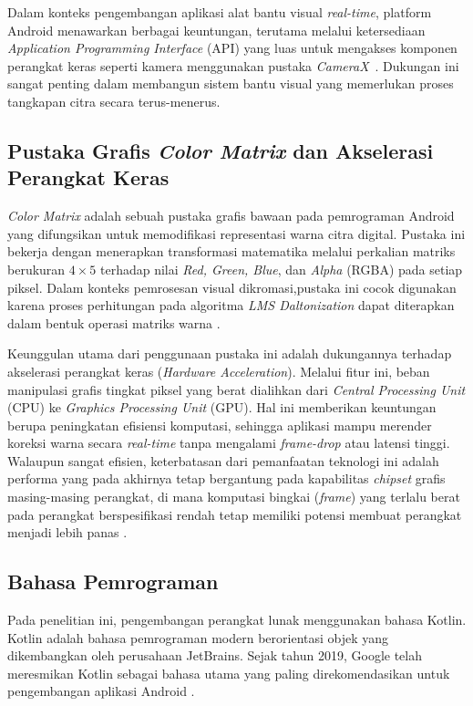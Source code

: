 Dalam konteks pengembangan aplikasi alat bantu visual \textit{real-time}, platform Android menawarkan berbagai keuntungan, terutama melalui ketersediaan \textit{Application Programming Interface} (API) yang luas untuk mengakses komponen perangkat keras seperti kamera menggunakan pustaka \textit{CameraX}~\parencite{camerax_architecture}.
Dukungan ini sangat penting dalam membangun sistem bantu visual yang memerlukan proses tangkapan citra secara terus-menerus.


\subsection{Pustaka Grafis \textit{Color Matrix} dan Akselerasi Perangkat Keras}\label{subsec:colormatrix-gpu}
\textit{Color Matrix} adalah sebuah pustaka grafis bawaan pada pemrograman Android yang difungsikan untuk memodifikasi representasi warna citra digital.
Pustaka ini bekerja dengan menerapkan transformasi matematika melalui perkalian matriks berukuran $4\times5$ terhadap nilai \textit{Red, Green, Blue}, dan \textit{Alpha} (RGBA) pada setiap piksel.
Dalam konteks pemrosesan visual dikromasi,pustaka ini cocok digunakan karena proses perhitungan pada algoritma \textit{LMS Daltonization} dapat diterapkan dalam bentuk operasi matriks warna \parencite{android_colormatrix}.

Keunggulan utama dari penggunaan pustaka ini adalah dukungannya terhadap akselerasi perangkat keras (\textit{Hardware Acceleration}). Melalui fitur ini, beban manipulasi grafis tingkat piksel yang berat dialihkan dari \textit{Central Processing Unit} (CPU) ke \textit{Graphics Processing Unit} (GPU).
Hal ini memberikan keuntungan berupa peningkatan efisiensi komputasi, sehingga aplikasi mampu merender koreksi warna secara \textit{real-time} tanpa mengalami \textit{frame-drop} atau latensi tinggi.
Walaupun sangat efisien, keterbatasan dari pemanfaatan teknologi ini adalah performa yang pada akhirnya tetap bergantung pada kapabilitas \textit{chipset} grafis masing-masing perangkat, di mana komputasi bingkai (\textit{frame}) yang terlalu berat pada perangkat berspesifikasi rendah tetap memiliki potensi membuat perangkat menjadi lebih panas \parencite{android_hardware_accel}.


\subsection{Bahasa Pemrograman}
Pada penelitian ini, pengembangan perangkat lunak menggunakan bahasa Kotlin.
Kotlin adalah bahasa pemrograman modern berorientasi objek yang dikembangkan oleh perusahaan JetBrains.
Sejak tahun 2019, Google telah meresmikan Kotlin sebagai bahasa utama yang paling direkomendasikan untuk pengembangan aplikasi Android \parencite{android_kotlin_first}.

